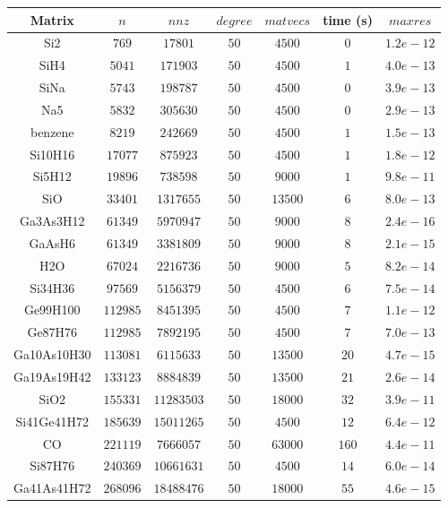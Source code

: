\begin{tabular}{c|c|c|c|c|c|c}
Matrix & $n$ & $nnz$ & $degree$ & $matvecs$ & time (s) & $maxres$ \\\hline
Si2 & $769$ & $17801$ & $50$ & $4500$ & $0$ & $1.2e-12$ \\
SiH4 & $5041$ & $171903$ & $50$ & $4500$ & $1$ & $4.0e-13$ \\
SiNa & $5743$ & $198787$ & $50$ & $4500$ & $0$ & $3.9e-13$ \\
Na5 & $5832$ & $305630$ & $50$ & $4500$ & $0$ & $2.9e-13$ \\
benzene & $8219$ & $242669$ & $50$ & $4500$ & $1$ & $1.5e-13$ \\
Si10H16 & $17077$ & $875923$ & $50$ & $4500$ & $1$ & $1.8e-12$ \\
Si5H12 & $19896$ & $738598$ & $50$ & $9000$ & $1$ & $9.8e-11$ \\
SiO & $33401$ & $1317655$ & $50$ & $13500$ & $6$ & $8.0e-13$ \\
Ga3As3H12 & $61349$ & $5970947$ & $50$ & $9000$ & $8$ & $2.4e-16$ \\
GaAsH6 & $61349$ & $3381809$ & $50$ & $9000$ & $8$ & $2.1e-15$ \\
H2O & $67024$ & $2216736$ & $50$ & $9000$ & $5$ & $8.2e-14$ \\
Si34H36 & $97569$ & $5156379$ & $50$ & $4500$ & $6$ & $7.5e-14$ \\
Ge99H100 & $112985$ & $8451395$ & $50$ & $4500$ & $7$ & $1.1e-12$ \\
Ge87H76 & $112985$ & $7892195$ & $50$ & $4500$ & $7$ & $7.0e-13$ \\
Ga10As10H30 & $113081$ & $6115633$ & $50$ & $13500$ & $20$ & $4.7e-15$ \\
Ga19As19H42 & $133123$ & $8884839$ & $50$ & $13500$ & $21$ & $2.6e-14$ \\
SiO2 & $155331$ & $11283503$ & $50$ & $18000$ & $32$ & $3.9e-11$ \\
Si41Ge41H72 & $185639$ & $15011265$ & $50$ & $4500$ & $12$ & $6.4e-12$ \\
CO & $221119$ & $7666057$ & $50$ & $63000$ & $160$ & $4.4e-11$ \\
Si87H76 & $240369$ & $10661631$ & $50$ & $4500$ & $14$ & $6.0e-14$ \\
Ga41As41H72 & $268096$ & $18488476$ & $50$ & $18000$ & $55$ & $4.6e-15$ \\
\end{tabular}